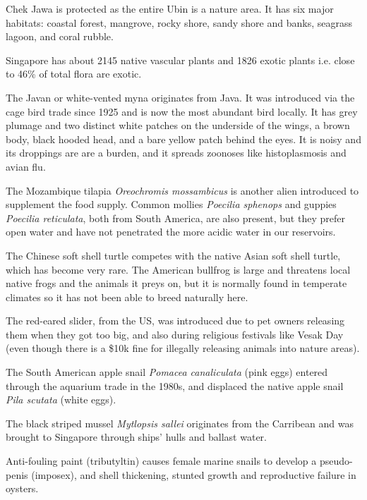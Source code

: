 \documentclass{slnotes}
\newcommand{\scn}[1]{\textit{#1}}
\begin{document}
Chek Jawa is protected as the entire Ubin is a nature area. It has six major habitats: coastal forest, mangrove, rocky shore, sandy shore and banks, seagrass lagoon, and coral rubble.

Singapore has about 2145 native vascular plants and 1826 exotic plants i.e. close to 46\% of total flora are exotic.

The Javan or white-vented myna originates from Java. It was introduced via the cage bird trade since 1925 and is now the most abundant bird locally. It has grey plumage and two distinct white patches on the underside of the wings, a brown body, black hooded head, and a bare yellow patch behind the eyes. It is noisy and its droppings are are a burden, and it spreads zoonoses like histoplasmosis and avian flu.

The Mozambique tilapia \scn{Oreochromis mossambicus} is another alien introduced to supplement the food supply. Common mollies \scn{Poecilia sphenops} and guppies \scn{Poecilia reticulata}, both from South America, are also present, but they prefer open water and have not penetrated the more acidic water in our reservoirs.

The Chinese soft shell turtle competes with the native Asian soft shell turtle, which has become very rare. The American bullfrog is large and threatens local native frogs and the animals it preys on, but it is normally found in temperate climates so it has not been able to breed naturally here.

The red-eared slider, from the US, was introduced due to pet owners releasing them when they got too big, and also during religious festivals like Vesak Day (even though there is a \$10k fine for illegally releasing animals into nature areas).

The South American apple snail \scn{Pomacea canaliculata} (pink eggs) entered through the aquarium trade in the 1980s, and displaced the native apple snail \scn{Pila scutata} (white eggs).

The black striped mussel \scn{Mytlopsis sallei} originates from the Carribean and was brought to Singapore through ships' hulls and ballast water.

Anti-fouling paint (tributyltin) causes female marine snails to develop a pseudo-penis (imposex), and shell thickening, stunted growth and reproductive failure in oysters.
\end{document}
